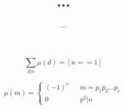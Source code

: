 \documentclass[12pt]{article}
\author{...}
\title{...}
\begin{document}
$$\sum_{d|n}\mu(d)=[n==1]$$ 


$$ \mu(m)=\left\{
\begin{array}{rcl}
(-1)^r      &      & {m=p_1p_2...p_r}\\
0  &      & {p^2|n}
\end{array} \right.
$$
\end{document}
